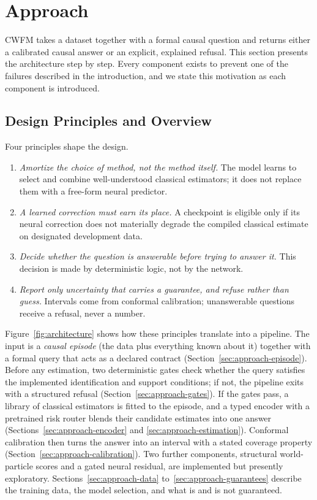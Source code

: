 \documentclass[electronics,article,submit,oneauthor]{Definitions/mdpi}
\begin{document}
\section{Approach}\label{sec:approach}

CWFM takes a dataset together with a formal causal question and returns either a calibrated causal answer or an explicit, explained refusal. This section presents the architecture step by step. Every component exists to prevent one of the failures described in the introduction, and we state this motivation as each component is introduced.

\subsection{Design Principles and Overview}\label{sec:approach-overview}

Four principles shape the design.

\begin{enumerate}
\item \emph{Amortize the choice of method, not the method itself.} The model learns to select and combine well-understood classical estimators; it does not replace them with a free-form neural predictor.
\item \emph{A learned correction must earn its place.} A checkpoint is eligible only if its neural correction does not materially degrade the compiled classical estimate on designated development data.
\item \emph{Decide whether the question is answerable before trying to answer it.} This decision is made by deterministic logic, not by the network.
\item \emph{Report only uncertainty that carries a guarantee, and refuse rather than guess.} Intervals come from conformal calibration; unanswerable questions receive a refusal, never a number.
\end{enumerate}

Figure~\ref{fig:architecture} shows how these principles translate into a pipeline. The input is a \emph{causal episode} (the data plus everything known about it) together with a formal query that acts as a declared contract (Section~\ref{sec:approach-episode}). Before any estimation, two deterministic gates check whether the query satisfies the implemented identification and support conditions; if not, the pipeline exits with a structured refusal (Section~\ref{sec:approach-gates}). If the gates pass, a library of classical estimators is fitted to the episode, and a typed encoder with a pretrained risk router blends their candidate estimates into one answer (Sections~\ref{sec:approach-encoder} and \ref{sec:approach-estimation}). Conformal calibration then turns the answer into an interval with a stated coverage property (Section~\ref{sec:approach-calibration}). Two further components, structural world-particle scores and a gated neural residual, are implemented but presently exploratory. Sections~\ref{sec:approach-data} to~\ref{sec:approach-guarantees} describe the training data, the model selection, and what is and is not guaranteed.
\end{document}
